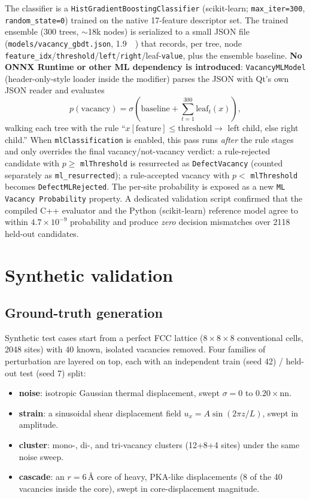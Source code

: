 \documentclass[11pt]{article}
\newcommand{\code}[1]{\texttt{#1}}
\newcommand{\attr}[1]{\texttt{#1}}
\begin{document}
The classifier is a \code{HistGradientBoostingClassifier} (scikit-learn; \code{max\_iter=300},
\code{random\_state=0}) trained on the native 17-feature descriptor set. The trained ensemble
(300 trees, $\sim$18k nodes) is serialized to a small JSON file
(\code{models/vacancy\_gbdt.json}, \SI{1.9}{\mega\byte}) that records, per tree, node
\code{feature\_idx}/\code{threshold}/\code{left}/\code{right}/leaf-\code{value}, plus the ensemble
baseline. \textbf{No ONNX Runtime or other ML dependency is introduced}: \code{VacancyMLModel}
(header-only-style loader inside the modifier) parses the JSON with Qt's own JSON reader and
evaluates
\[
p(\text{vacancy}) = \sigma\!\left(\text{baseline} + \sum_{t=1}^{300} \mathrm{leaf}_t(x)\right),
\]
walking each tree with the rule ``$x[\text{feature}] \leq \text{threshold} \to$ left child, else
right child.'' When \code{mlClassification} is enabled, this pass runs \emph{after} the rule stages
and only overrides the final vacancy/not-vacancy verdict: a rule-rejected candidate with
$p \geq$ \code{mlThreshold} is resurrected as \attr{DefectVacancy} (counted separately as
\attr{ml\_resurrected}); a rule-accepted vacancy with $p <$ \code{mlThreshold} becomes
\attr{DefectMLRejected}. The per-site probability is exposed as a new \attr{ML Vacancy Probability}
property. A dedicated validation script confirmed that the compiled C++ evaluator and the Python
(scikit-learn) reference model agree to within $4.7\times10^{-9}$ probability and produce
\emph{zero} decision mismatches over 2118 held-out candidates.

\section{Synthetic validation}

\subsection{Ground-truth generation}

Synthetic test cases start from a perfect FCC lattice ($8\times8\times8$ conventional cells,
2048 sites) with 40 known, isolated vacancies removed. Four families of perturbation are layered
on top, each with an independent train (seed 42) / held-out test (seed 7) split:

\begin{itemize}[nosep]
    \item \textbf{noise}: isotropic Gaussian thermal displacement, swept $\sigma = 0$ to
    $0.20\times$nn.
    \item \textbf{strain}: a sinusoidal shear displacement field $u_x = A\sin(2\pi z/L)$, swept in
    amplitude.
    \item \textbf{cluster}: mono-, di-, and tri-vacancy clusters (12+8+4 sites) under the same
    noise sweep.
    \item \textbf{cascade}: an $r=6$\,\r{A} core of heavy, PKA-like displacements (8 of the 40
    vacancies inside the core), swept in core-displacement magnitude.
\end{itemize}
\end{document}
